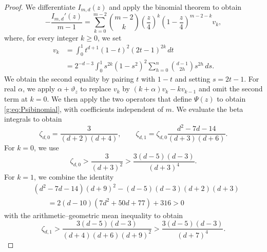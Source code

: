 \documentclass[10pt,a4paper]{article}
\numberwithin{equation}{section}
\theoremstyle{remark}\newtheorem{remark}[theorem]{Remark}
\begin{document}
\begin{proof}
We differentiate $I_{m,d}(z)$ and apply the binomial theorem to obtain
\[
 -\frac{I_{m,d}'(z)}{m-1}
 =\sum_{k=0}^{m-2}\binom{m-2}{k}
 \left(\frac z4\right)^k\left(1-\frac z4\right)^{m-2-k}v_k,
\]
where, for every integer $k\ge0$, we set
\[
\begin{aligned}
 v_k&=\int_0^1t^{d+1}(1-t)^2(2t-1)^{2k}\,dt\\
 &=2^{-d-3}\int_0^1s^{2k}(1-s^2)^2
 \sum_{h=0}^{n}\binom{d-1}{2h}s^{2h}\,ds.
\end{aligned}
\]
We obtain the second equality by pairing $t$ with $1-t$ and setting $s=2t-1$.
For real $\alpha$, we apply $\alpha+\vartheta_z$ to replace $v_k$ by
$(k+\alpha)v_k-kv_{k-1}$ and omit the second term at $k=0$.
We then apply the two operators that define $\Psi(z)$ to obtain
\eqref{g:eq:Psibinomial}, with coefficients independent of $m$.
We evaluate the beta integrals to obtain
\[
 \zeta_{d,0}=\frac{3}{(d+2)(d+4)},\qquad
 \zeta_{d,1}=\zeta_{d,0}\frac{d^2-7d-14}{(d+3)(d+6)}.
\]
For $k=0$, we use
\[
 \zeta_{d,0}>\frac{3}{(d+3)^2}
 >\frac{3(d-5)(d-3)}{(d+3)^4}.
\] For $k=1$, we combine the identity
\[
\begin{aligned}
 &(d^2-7d-14)(d+9)^2-(d-5)(d-3)(d+2)(d+3)\\
 &\qquad=2(d-10)(7d^2+50d+77)+316>0
\end{aligned}
\]
with the arithmetic--geometric mean inequality to obtain
\[
 \zeta_{d,1}>
 \frac{3(d-5)(d-3)}{(d+4)(d+6)(d+9)^2}
 >\frac{3(d-5)(d-3)}{(d+7)^4}.
\]


\end{proof}
\end{document}
